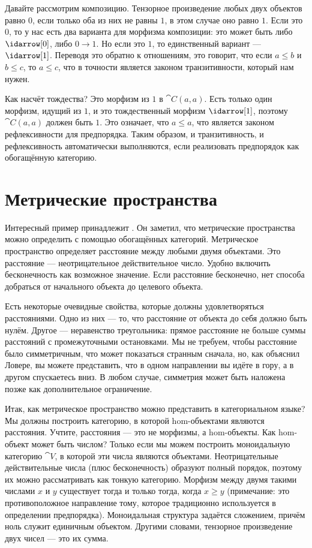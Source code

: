 Давайте рассмотрим композицию. Тензорное произведение любых двух объектов
равно $0$, если только оба из них не равны $1$, в этом случае оно равно $1$. Если это $0$, то
у нас есть два варианта для морфизма композиции: это может быть либо
$\idarrow[0]$, либо $0 \to 1$. Но если это $1$, то единственный
вариант — $\idarrow[1]$. Переводя это обратно к отношениям, это говорит,
что если $a \leqslant b$ и $b \leqslant c$, то
$a \leqslant c$, что в точности является законом транзитивности, который нам
нужен.

Как насчёт тождества? Это морфизм из $1$ в $\cat{C}(a, a)$.
Есть только один морфизм, идущий из $1$, и это тождественный морфизм
$\idarrow[1]$, поэтому $\cat{C}(a, a)$ должен быть $1$. Это означает, что
$a \leqslant a$, что является законом рефлексивности для
предпорядка. Таким образом, и транзитивность, и рефлексивность автоматически
выполняются, если реализовать предпорядок как обогащённую категорию.

\section{Метрические пространства}

Интересный пример принадлежит
. Он заметил, что метрические пространства можно определить с помощью обогащённых
категорий. Метрическое пространство определяет расстояние между любыми двумя объектами.
Это расстояние — неотрицательное действительное число. Удобно включить
бесконечность как возможное значение. Если расстояние бесконечно, нет
способа добраться от начального объекта до целевого объекта.

Есть некоторые очевидные свойства, которые должны удовлетворяться
расстояниями. Одно из них — то, что расстояние от объекта до себя
должно быть нулём. Другое — неравенство треугольника: прямое расстояние
не больше суммы расстояний с промежуточными остановками. Мы не
требуем, чтобы расстояние было симметричным, что может показаться странным сначала,
но, как объяснил Ловере, вы можете представить, что в одном направлении вы
идёте в гору, а в другом спускаетесь вниз. В любом случае,
симметрия может быть наложена позже как дополнительное ограничение.

Итак, как метрическое пространство можно представить в категориальном языке? Мы должны
построить категорию, в которой hom-объектами являются расстояния. Учтите,
расстояния — это не морфизмы, а hom-объекты. Как hom-объект может быть
числом? Только если мы можем построить моноидальную категорию $\cat{V}$, в которой
эти числа являются объектами. Неотрицательные действительные числа (плюс бесконечность)
образуют полный порядок, поэтому их можно рассматривать как тонкую категорию.
Морфизм между двумя такими числами $x$ и $y$ существует тогда и
только тогда, когда $x \geqslant y$ (примечание: это противоположное
направление тому, которое традиционно используется в определении
предпорядка). Моноидальная структура задаётся сложением, причём ноль
служит единичным объектом. Другими словами, тензорное произведение двух
чисел — это их сумма.

